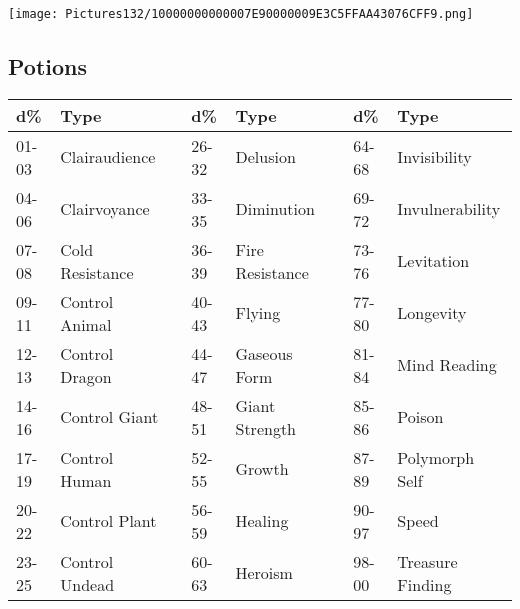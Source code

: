 \documentclass[a4paper,twoside,openany,10pt]{book}
\begin{document}
\vfill

 \texttt{[image: Pictures132/10000000000007E90000009E3C5FFAA43076CFF9.png]}  

\pagebreak

\subsection{Potions}\label{potions}

\begin{tabular*}{1\linewidth}{@{\extracolsep{\fill}}llllllll}
\textbf{d\%} & \textbf{Type} & & \textbf{d\%} & \textbf{Type} & & \textbf{d\%} & \textbf{Type} \\\toprule
01-03 & Clairaudience & & 26-32 & Delusion & & 64-68 & Invisibility \\\hline
04-06 & Clairvoyance & & 33-35 & Diminution & & 69-72 &
Invulnerability \\\hline
07-08 & Cold Resistance & & 36-39 & Fire Resistance & & 73-76 &
Levitation \\\hline
09-11 & Control Animal & & 40-43 & Flying & & 77-80 & Longevity \\\hline
12-13 & Control Dragon & & 44-47 & Gaseous Form & & 81-84 & Mind
Reading \\\hline
14-16 & Control Giant & & 48-51 & Giant Strength & & 85-86 & Poison \\\hline
17-19 & Control Human & & 52-55 & Growth & & 87-89 & Polymorph Self \\\hline
20-22 & Control Plant & & 56-59 & Healing & & 90-97 & Speed \\\hline
23-25 & Control Undead & & 60-63 & Heroism & & 98-00 & Treasure
Finding \\\bottomrule
\end{tabular*}
\end{document}
